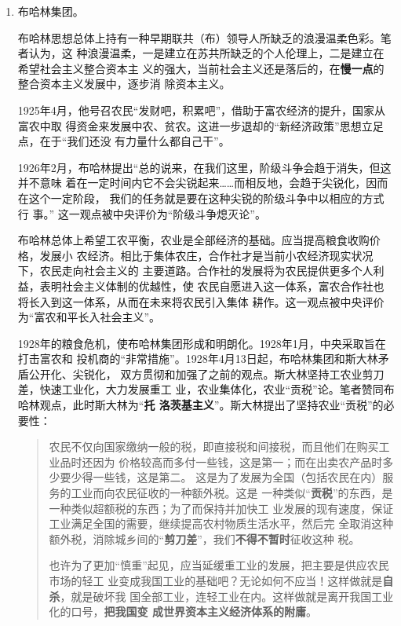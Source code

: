 \begin{enumerate}
\item 布哈林集团。

  布哈林思想总体上持有一种早期联共（布）领导人所缺乏的浪漫温柔色彩。笔者认为，这
  种浪漫温柔，一是建立在苏共所缺乏的个人伦理上，二是建立在希望社会主义整合资本主
  义的强大，当前社会主义还是落后的，在\textbf{慢一点}的整合资本主义发展中，逐步消
  除资本主义。

  1925年4月，他号召农民``发财吧，积累吧''，借助于富农经济的提升，国家从富农中取
  得资金来发展中农、贫农。这进一步退却的``新经济政策''思想立足点，在于``我们还没
  有力量什么都自己干''。

  1926年2月，布哈林提出``总的说来，在我们这里，阶级斗争会趋于消失，但这并不意味
  着在一定时间内它不会尖锐起来……而相反地，会趋于尖锐化，因而在这个一定阶段，
  我们的任务就是要在这种尖锐的阶级斗争中以相应的方式行
  事。'' 这一观点被中央评价为``阶级斗争熄灭论''。

  布哈林总体上希望工农平衡，农业是全部经济的基础。应当提高粮食收购价格，发展小
  农经济。相比于集体农庄，合作社才是当前小农经济现实状况下，农民走向社会主义的
  主要道路。合作社的发展将为农民提供更多个人利益，表明社会主义体制的优越性，使
  农民自愿进入这一体系，富农合作社也将长入到这一体系，从而在未来将农民引入集体
  耕作。这一观点被中央评价为``富农和平长入社会主义''。

  1928年的粮食危机，使布哈林集团形成和明朗化。1928年1月，中央采取旨在打击富农和
  投机商的``非常措施''。1928年4月13日起，布哈林集团和斯大林矛盾公开化、尖锐化，
  双方贯彻和加强了之前的观点。斯大林坚持工农业剪刀差，快速工业化，大力发展重工
  业，农业集体化，农业``贡税''论。笔者赞同布哈林观点，此时斯大林为``\textbf{托
    洛茨基主义}''。斯大林提出了坚持农业``贡税''的必要性：
  \begin{quotation}
    农民不仅向国家缴纳一般的税，即直接税和间接税，而且他们在购买工业品时还因为
    价格较高而多付一些钱，这是第一；而在出卖农产品时多少要少得一些钱，这是第二。
    这是为了发展为全国（包括农民在内）服务的工业而向农民征收的一种额外税。这是
    一种类似``\textbf{贡税}''的东西，是一种类似超额税的东西；为了而保持并加快工
    业发展的现有速度，保证工业满足全国的需要，继续提高农村物质生活水平，然后完
    全取消这种额外税，消除城乡间的``\textbf{剪刀差}''，我们\textbf{不得不暂时}征收这种
    税。 

    也许为了更加``慎重''起见，应当延缓重工业的发展，把主要是供应农民市场的轻工
    业变成我国工业的基础吧？无论如何不应当！这样做就是\textbf{自杀}，就是破坏我
    国全部工业，连轻工业在内。这样做就是离开我国工业化的口号，\textbf{把我国变
      成世界资本主义经济体系的附庸}。
  \end{quotation}


\end{enumerate}
